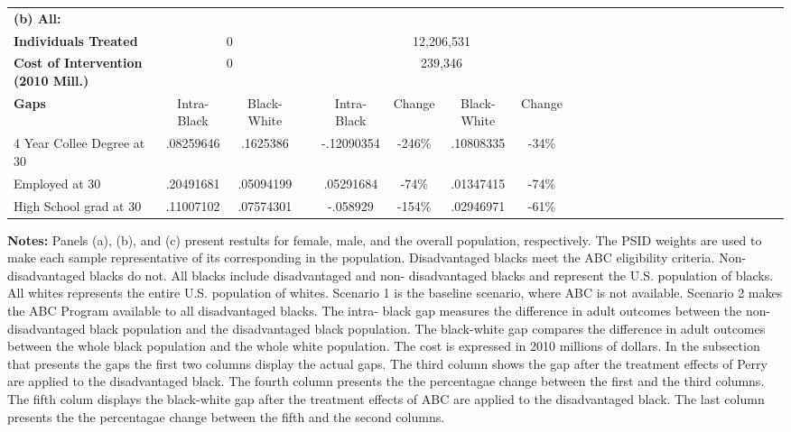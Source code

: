 \begin{table}[htbp]
\begin{center}
\begin{tabular}{lcccccccccccccccccccccccc}
\hline
 \textbf{(b) All:} & \multicolumn{2}{c}{}   &  &\multicolumn{4}{c}{}   \\[0.02cm] 
\textbf{Individuals Treated} &\multicolumn{2}{c}{ 0 } &
 &\multicolumn{4}{c}{  12,206,531} &
 \\[0.2cm]  
\textbf{Cost of Intervention (2010 Mill.)} &\multicolumn{2}{c}{ 0 } &
 &\multicolumn{4}{c}{     239,346} &
 \\[0.2cm]  
\textbf{Gaps}&Intra-Black &Black-White & &Intra-Black &Change &Black-White &Change  \\[0.02cm] 
\hline
4 Year Collee Degree at 30 &.08259646&.1625386&&-.12090354&        -246\% &.10808335&         -34\% &
 \\[0.2cm]  
Employed at 30 &.20491681&.05094199&&.05291684&         -74\% &.01347415&         -74\% &
 \\[0.2cm]  
High School grad at 30 &.11007102&.07574301&&-.058929&        -154\% &.02946971&         -61\% &
 \\[0.2cm]  
  \hline \hline    \end{tabular}
 \end{center} 
       {\scriptsize  
       {\raggedright 
{\bfseries Notes:} Panels (a), (b), and (c) present restults for female, male, and the overall population, respectively. The PSID weights are used to make each sample representative of its corresponding in the population. Disadvantaged blacks meet the  ABC eligibility criteria. Non-disadvantaged blacks do  not. All blacks include disadvantaged and non- disadvantaged blacks and represent the U.S. population of blacks. All  whites represents the entire U.S. population of whites.  Scenario 1 is the baseline scenario, where ABC is not available. Scenario 2  makes the ABC Program available to all disadvantaged blacks. The intra- black gap measures the difference in adult outcomes between the non- disadvantaged black population and the disadvantaged black population.  The black-white gap compares the difference in adult outcomes between the  whole black population and the whole white population. The cost is expressed in 2010 millions of dollars. In the subsection that presents the gaps the first two columns display the actual gaps. The third column shows the gap after the treatment effects of Perry are applied to the disadvantaged black. The fourth column presents the the percentagae change between the first and the third columns. The fifth colum displays the black-white gap after the treatment effects of ABC are applied to the disadvantaged black.  The last column presents the the percentagae change between the fifth and the second columns.} } 
 \end{table}
